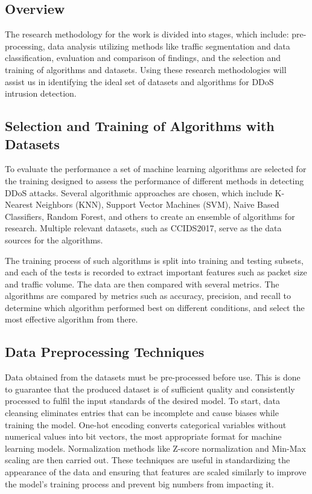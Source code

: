 \documentclass[a4paper, 12pt]{article}
\begin{document}
\subsection{Overview}
The research methodology for the work is divided into stages, which include: pre-processing, data analysis utilizing methods like traffic segmentation and data classification, evaluation and comparison of findings, and the selection and training of algorithms and datasets. Using these research methodologies will assist us in identifying the ideal set of datasets and algorithms for DDoS intrusion detection.


\subsection{ Selection and Training of Algorithms with Datasets}

To evaluate the performance a set of machine learning algorithms are selected for the training designed to assess the performance of different methods in detecting DDoS attacks. Several algorithmic approaches are chosen, which include K-Nearest Neighbors (KNN), Support Vector Machines (SVM), Naive Based Classifiers, Random Forest, and others to create an ensemble of algorithms for research. Multiple relevant datasets, such as CCIDS2017, serve as the data sources for the algorithms. 

The training process of such algorithms is split into training and testing subsets, and each of the tests is recorded to extract important features such as packet size and traffic volume. The data are then compared with several metrics. The algorithms are compared by metrics such as accuracy, precision, and recall to determine which algorithm performed best on different conditions, and select the most effective algorithm from there.

\subsection{ Data Preprocessing Techniques }

Data obtained from the datasets must be pre-processed before use. This is done to guarantee that the produced dataset is of sufficient quality and consistently processed to fulfil the input standards of the desired model. To start, data cleansing eliminates entries that can be incomplete and cause biases while training the model. One-hot encoding converts categorical variables without numerical values into bit vectors, the most appropriate format for machine learning models.  Normalization methods like Z-score normalization and Min-Max scaling are then carried out. These techniques are useful in standardizing the appearance of the data and ensuring that features are scaled similarly to improve the model's training process and prevent big numbers from impacting it.
\end{document}

